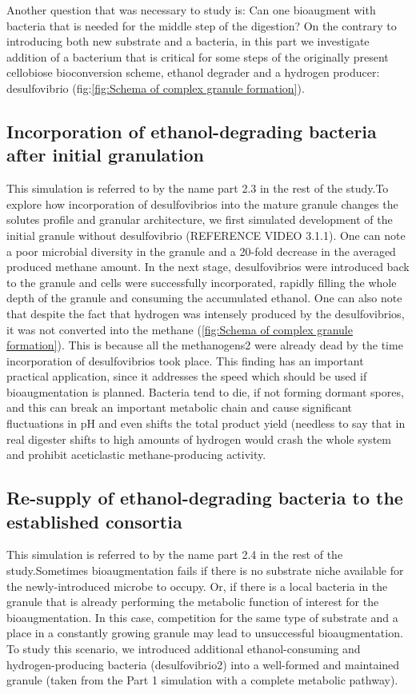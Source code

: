 Another question that was necessary to study is: Can one bioaugment with bacteria that is needed for the middle step of the digestion? On the contrary to introducing both new substrate and a bacteria, in this part we investigate addition of a bacterium that is critical for some steps of the originally present cellobiose bioconversion scheme, ethanol degrader and a hydrogen producer: desulfovibrio (fig:\ref{fig:Schema of complex granule formation}).

\subsection{Incorporation of ethanol-degrading bacteria after initial granulation}

This simulation is referred to by the name part 2.3 in the rest of the study.To explore how incorporation of desulfovibrios into the mature granule changes the solutes profile and granular architecture, we first simulated development of the initial granule without desulfovibrio (REFERENCE VIDEO 3.1.1). One can note a poor microbial diversity in the granule and a 20-fold decrease in the averaged produced methane amount. In the next stage, desulfovibrios were introduced back to the granule and cells were successfully incorporated, rapidly filling the whole depth of the granule and consuming the accumulated ethanol. One can also note that despite the fact that hydrogen was intensely produced by the desulfovibrios, it was not converted into the methane  (\ref{fig:Schema of complex granule formation}). This is because all the methanogens2 were already dead by the time incorporation of desulfovibrios took place. This finding has an important practical application, since it addresses the speed which should be used if bioaugmentation is planned. Bacteria tend to die, if not forming dormant spores, and this can break an important metabolic chain and cause significant fluctuations in pH and even shifts the total product yield (needless to say that in real digester shifts to high amounts of hydrogen would crash the whole system and prohibit aceticlastic methane-producing activity. 

\subsection{Re-supply of ethanol-degrading bacteria to the established consortia}

This simulation is referred to by the name part 2.4 in the rest of the study.Sometimes bioaugmentation fails if there is no substrate niche available for the newly-introduced microbe to occupy. Or, if there is a local bacteria in the granule that is already performing the metabolic function of interest for the bioaugmentation. In this case, competition for the same type of substrate and a place in a constantly growing granule may lead to unsuccessful bioaugmentation. To study this scenario, we introduced additional ethanol-consuming and hydrogen-producing bacteria (desulfovibrio2) into a well-formed and maintained granule (taken from the Part 1 simulation with a complete metabolic pathway).   

